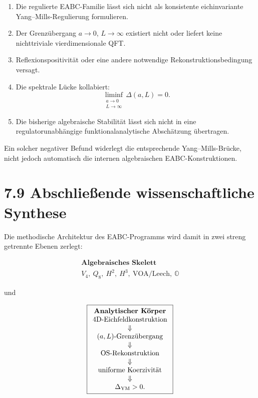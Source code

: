 \documentclass[11pt,a4paper]{article}
\begin{document}
\begin{enumerate}[leftmargin=1.6em]
\item Die regulierte EABC-Familie lässt sich nicht als konsistente
eichinvariante Yang--Mills-Regulierung formulieren.

\item Der Grenzübergang $a\to0$, $L\to\infty$ existiert nicht oder liefert
keine nichttriviale vierdimensionale QFT.

\item Reflexionspositivität oder eine andere notwendige
Rekonstruktionsbedingung versagt.

\item Die spektrale Lücke kollabiert:
\[
\liminf_{\substack{a\to0\\L\to\infty}}\Delta(a,L)=0.
\]

\item Die bisherige algebraische Stabilität lässt sich nicht in eine
regulatorunabhängige funktionalanalytische Abschätzung übertragen.
\end{enumerate}

Ein solcher negativer Befund widerlegt die entsprechende Yang--Mills-Brücke,
nicht jedoch automatisch die internen algebraischen EABC-Konstruktionen.

\section*{7.9 Abschließende wissenschaftliche Synthese}

Die methodische Architektur des EABC-Programms wird damit in zwei streng
getrennte Ebenen zerlegt:

\[
\boxed{
\begin{array}{c}
\textbf{Algebraisches Skelett}\\
V_4,\ Q_8,\ H^2,\ H^3,\ \text{VOA/Leech},\ \mathbb O
\end{array}}
\]

und

\[
\boxed{
\begin{array}{c}
\textbf{Analytischer Körper}\\
\text{4D-Eichfeldkonstruktion}\\
\Downarrow\\
(a,L)\text{-Grenzübergang}\\
\Downarrow\\
\text{OS-Rekonstruktion}\\
\Downarrow\\
\text{uniforme Koerzivität}\\
\Downarrow\\
\Delta_{\rm YM}>0.
\end{array}}
\]
\end{document}
